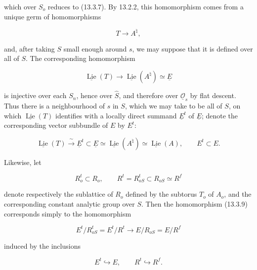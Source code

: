 \noindent
which over $S_o$ reduces to (13.3.7). By 13.2.2, this homomorphism comes
from a unique germ of homomorphisms

\begin{equation}\tag{13.3.9}
 T\longrightarrow A^\natural,
\end{equation}

\noindent
and, after taking $S$ small enough around $s$, we may suppose that it is
defined over all of $S$. The corresponding homomorphism

\begin{equation*}
 \underline{\operatorname{Lie}}(T)\longrightarrow
 \underline{\operatorname{Lie}}(A^\natural)\simeq\underline E
\end{equation*}

\noindent
is injective over each $S_n$, hence over $\widehat S$, and therefore over
$\underline{\mathcal O}_s$ by flat descent. Thus there is a neighbourhood
of $s$ in $S$, which we may take to be all of $S$, on which
$\underline{\operatorname{Lie}}(T)$ identifies with a locally direct
summand $\underline E^t$ of $\underline E$; denote the corresponding
vector subbundle of $E$ by $E^t$:

\begin{equation}\tag{13.3.10}
 \underline{\operatorname{Lie}}(T)\xrightarrow{\ \sim\ }
 \underline E^t\subset\underline E\simeq
 \underline{\operatorname{Lie}}(A^\natural)\simeq
 \underline{\operatorname{Lie}}(A),
 \qquad E^t\subset E.
\end{equation}

\noindent
Likewise, let

\begin{equation}\tag{13.3.11}
 R_o^t\subset R_o,
 \qquad R^t=R_{oS}^t\subset R_{oS}\simeq R^f
\end{equation}

\noindent
denote respectively the sublattice of $R_o$ defined by the subtorus
$T_o$ of $A_o$, and the corresponding constant analytic group over $S$.
Then the homomorphism (13.3.9) corresponds simply to the homomorphism

\begin{equation*}
 E^t/R_{oS}^t=E^t/R^t\longrightarrow E/R_{oS}=E/R^f
\end{equation*}

\noindent
induced by the inclusions

\begin{equation*}
 E^t\hookrightarrow E,
 \qquad R^t\hookrightarrow R^f.
\end{equation*}

